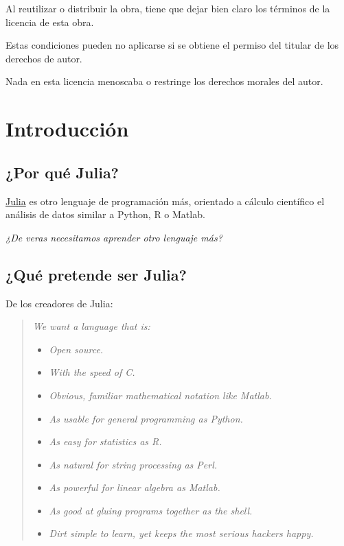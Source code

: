 \documentclass[
  letterpaper,
  DIV=11,
  numbers=noendperiod]{scrreprt}
\providecommand{\tightlist}{%
  \setlength{\itemsep}{0pt}\setlength{\parskip}{0pt}}\usepackage{longtable,booktabs,array}
\begin{document}
Al reutilizar o distribuir la obra, tiene que dejar bien claro los
términos de la licencia de esta obra.

Estas condiciones pueden no aplicarse si se obtiene el permiso del
titular de los derechos de autor.

Nada en esta licencia menoscaba o restringe los derechos morales del
autor.


\hypertarget{introducciuxf3n}{%
\chapter{Introducción}\label{introducciuxf3n}}

\hypertarget{por-quuxe9-julia}{%
\section{¿Por qué Julia?}\label{por-quuxe9-julia}}

\href{https://julialang.org/}{Julia} es otro lenguaje de programación
más, orientado a cálculo científico el análisis de datos similar a
Python, R o Matlab.

\emph{¿De veras necesitamos aprender otro lenguaje más?}

\hypertarget{quuxe9-pretende-ser-julia}{%
\section{¿Qué pretende ser Julia?}\label{quuxe9-pretende-ser-julia}}

De los creadores de Julia:

\begin{quote}
\emph{We want a language that is:}

\begin{itemize}
\tightlist
\item
  \emph{Open source.}
\item
  \emph{With the speed of C.}
\item
  \emph{Obvious, familiar mathematical notation like Matlab.}
\item
  \emph{As usable for general programming as Python.}
\item
  \emph{As easy for statistics as R.}
\item
  \emph{As natural for string processing as Perl.}
\item
  \emph{As powerful for linear algebra as Matlab.}
\item
  \emph{As good at gluing programs together as the shell.}
\item
  \emph{Dirt simple to learn, yet keeps the most serious hackers happy.}
\end{itemize}
\end{quote}
\end{document}
